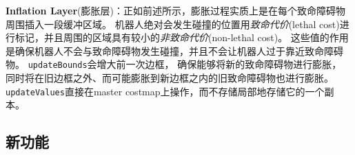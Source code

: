 \textbf{\color{blue}Inflation Layer}(膨胀层)：正如前述所示，膨胀过程实质上是在每个致命障碍物周围插入一段缓冲区域。 机器人绝对会发生碰撞的位置用\emph{致命代价}(lethal cost)进行标记，并且周围的区域具有较小的\emph{非致命代价}(non-lethal cost)。 
这些值的作用是确保机器人不会与致命障碍物发生碰撞，并且不会让机器人过于靠近致命障碍物。 \texttt{updateBounds}会增大前一次边框，
确保能够将新的致命障碍物进行膨胀，
同时将在旧边框之外、而可能膨胀到新边框之内的旧致命障碍物也进行膨胀。 
\texttt{updateValues}直接在master costmap上操作，而不存储局部地存储它的一个副本。


\subsection{新功能}

